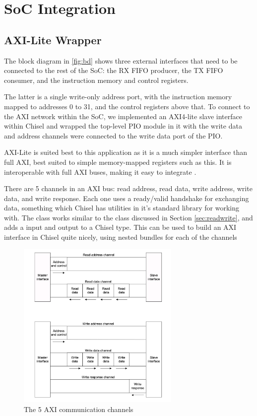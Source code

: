 \section{SoC Integration}

\subsection{AXI-Lite Wrapper}

The block diagram in \ref{fig:bd} shows three external interfaces that need to be connected to the rest of the SoC: the RX FIFO producer, the TX FIFO consumer, and the instruction memory and control registers.

The latter is a single write-only address port, with the instruction memory mapped to addresses 0 to 31, and the control registers above that. To connect to the AXI network within the SoC, we implemented an AXI4-lite slave interface within Chisel and wrapped the top-level PIO module in it with the write data and address channels were connected to the write data port of the PIO.

AXI-Lite is suited best to this application as it is a much simpler interface than full AXI, best suited to simple memory-mapped registers such as this. It is interoperable with full AXI buses, making it easy to integrate \cite{axi}.

There are 5 channels in an AXI bus: read address, read data, write address, write data, and write response. Each one uses a ready/valid handshake for exchanging data, something which Chisel has utilities in it's standard library for working with. The  class works similar to the  class discussed in Section \ref{sec:readwrite}, and adds a  input and  output to a Chisel  type. This can be used to build an AXI interface in Chisel quite nicely, using nested bundles for each of the channels

\begin{figure}[H]
    \centering
    \includegraphics[width=0.7\textwidth]{../img/axi-chan.png}
    \caption{The 5 AXI communication channels}
    \label{fig:axi-chan}
\end{figure}

